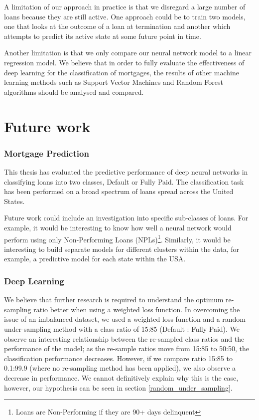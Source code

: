         A limitation of our approach in practice is that we disregard a large number of loans because they are still active. One approach could be to train two models, one that looks at the outcome of a loan at termination and another which attempts to predict its active state at some future point in time. 
        
        Another limitation is that we only compare our neural network model to a linear regression model. We believe that in order to fully evaluate the effectiveness of deep learning for the classification of mortgages, the results of other machine learning methods such as Support Vector Machines and Random Forest algorithms should be analysed and compared. 
        
    
    
    \section{Future work}
        
        \subsubsection{Mortgage Prediction}

            This thesis has evaluated the predictive performance of deep neural networks in classifying loans into two classes, Default or Fully Paid. The classification task has been performed on a broad spectrum of loans spread across the United States.
            
            Future work could include an investigation into specific sub-classes of loans. For example, it would be interesting to know how well a neural network would perform using only Non-Performing Loans (NPLs)\footnote{Loans are Non-Performing if they are 90+ days delinquent}. Similarly, it would be interesting to build separate models for different clusters within the data, for example, a predictive model for each state within the USA. 
        
        \subsubsection{Deep Learning}
            We believe that further research is required to understand the optimum re-sampling ratio better when using a weighted loss function. In overcoming the issue of an imbalanced dataset, we used a weighted loss function and a random under-sampling method with a class ratio of 15:85 (Default : Fully Paid). We observe an interesting relationship between the re-sampled class ratios and the performance of the model; as the re-sample ratios move from 15:85 to 50:50, the classification performance decreases. However, if we compare ratio 15:85 to 0.1:99.9 (where no re-sampling method has been applied), we also observe a decrease in performance. We cannot definitively explain why this is the case, however, our hypothesis can be seen in section \ref{random_under_sampling}. 
            

